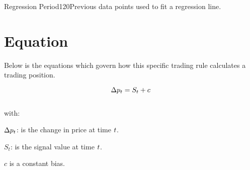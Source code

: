 \documentclass{article}
\begin{document}
\logo
{} %
\tblofcontents


{Regression Period}{120}{Previous data points used to fit a regression line.}{\lookbacklength}
\stoptable %

\section{Equation}
Below is the equations which govern how this specific trading rule calculates a trading position.

\begin{equation}
\Delta p_{t} = S_{t} + c
\end{equation}
\\
with:

$\Delta p_{t}$: is the change in price at time $t$.

$S_{t}$: is the signal value at time $t$.

$c$ is a constant bias.

\keyterms
\furtherlinks %
\end{document}
